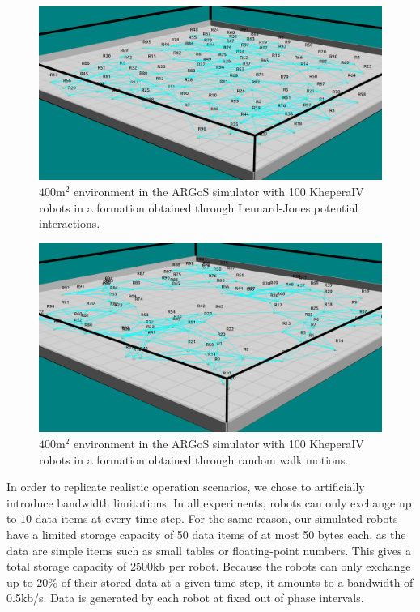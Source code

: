 \begin{figure}[htbp]
	\centering
    \includegraphics[width=\columnwidth]{figures/dora_mesh/argos_lennard.png}
    \caption[Lennard-Jones potential formation in ARGoS]{$400 \text{m}^2$ environment in the ARGoS simulator with 100 KheperaIV robots in a formation obtained through Lennard-Jones potential interactions.}
    \label{argos:lennard-jones}
\end{figure}

\begin{figure}[htbp]
	\centering
    \includegraphics[width=\columnwidth]{figures/dora_mesh/argos_random.png}
    \caption[Random formation in ARGoS]{$400 \text{m}^2$ environment in the ARGoS simulator with 100 KheperaIV robots in a formation obtained through random walk motions.}
    \label{argos:random-walk}
\end{figure}

In order to replicate realistic operation scenarios, we chose to artificially introduce bandwidth limitations. In all experiments, robots can only exchange up to 10 data items at every time step. For the same reason, our simulated robots have a limited storage capacity of 50 data items of at most 50 bytes each, as the data are simple items such as small tables or floating-point numbers. This gives a total storage capacity of 2500kb per robot. Because the robots can only exchange up to 20\% of their stored data at a given time step, it amounts to a bandwidth of 0.5kb/s. Data is generated by each robot at fixed out of phase intervals. 

